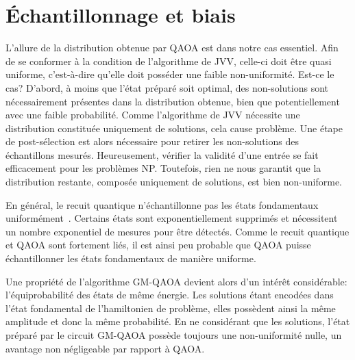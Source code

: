 
\section{Échantillonnage et biais}
\label{sec:echantillonnage-et-biais}

L'allure de la distribution obtenue par QAOA est dans notre cas essentiel. Afin de se conformer à la condition de l'algorithme de JVV, celle-ci doit être quasi uniforme, c'est-à-dire qu'elle doit posséder une faible non-uniformité. Est-ce le cas? D'abord, à moins que l'état préparé soit optimal, des non-solutions sont nécessairement présentes dans la distribution obtenue, bien que potentiellement avec une faible probabilité. Comme l'algorithme de JVV nécessite une distribution constituée uniquement de solutions, cela cause problème. Une étape de post-sélection est alors nécessaire pour retirer les non-solutions des échantillons mesurés. Heureusement, vérifier la validité d'une entrée se fait efficacement pour les problèmes \textsf{NP}. Toutefois, rien ne nous garantit que la distribution restante, composée uniquement de solutions, est bien non-uniforme.

En général, le recuit quantique n'échantillonne pas les états fondamentaux uniformément~\cite{matsudaGroundstateStatisticsAnnealing2009, mandraExponentiallyBiasedGroundState2017}. Certains états sont exponentiellement supprimés et nécessitent un nombre exponentiel de mesures pour être détectés. Comme le recuit quantique et QAOA sont fortement liés, il est ainsi peu probable que QAOA puisse échantillonner les états fondamentaux de manière uniforme.

Une propriété de l'algorithme GM-QAOA devient alors d'un intérêt considérable: l'équiprobabilité des états de même énergie. Les solutions étant encodées dans l'état fondamental de l'hamiltonien de problème, elles possèdent ainsi la même amplitude et donc la même probabilité. En ne considérant que les solutions, l'état préparé par le circuit GM-QAOA possède toujours une non-uniformité nulle, un avantage non négligeable par rapport à QAOA.
